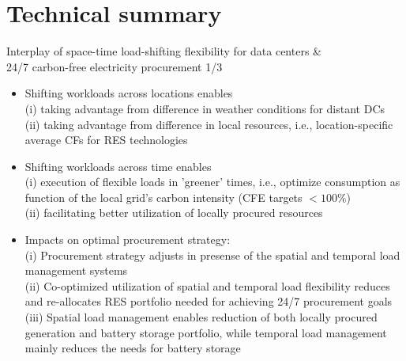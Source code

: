 \section{Technical summary}


\begin{frame}{Interplay of space-time load-shifting flexibility for data centers \& \\ 
  24/7 carbon-free electricity procurement 1/3}

  {\footnotesize
  \begin{itemize}

    \item [Spatial load management mechanisms] Shifting workloads across locations enables \\
          (i) taking advantage from \alert{difference in weather conditions} for distant DCs \\
          (ii) taking advantage from \alert{difference in local resources}, i.e., location-specific average CFs for RES technologies
    
    \item [Temporal load management mechanisms] Shifting workloads across time enables\\ 
          (i) \alert{execution of flexible loads in 'greener' times}, i.e., optimize consumption as function of the local grid's carbon intensity (CFE targets $<100\%$) \\
          (ii) facilitating \alert{better utilization of locally procured resources}

    \item [24/7 CFE procurement] Impacts on optimal procurement strategy:\\ 
          (i) Procurement strategy adjusts in presense of the spatial and temporal load management systems \\ 
          (ii) Co-optimized utilization of spatial and temporal load flexibility \alert{reduces and re-allocates RES portfolio} needed for achieving 24/7 procurement goals \\
          (iii) Spatial load management enables reduction of both locally procured generation and battery storage portfolio, while temporal load management mainly reduces the needs for battery storage \\

  \end{itemize}
  }
\end{frame}


